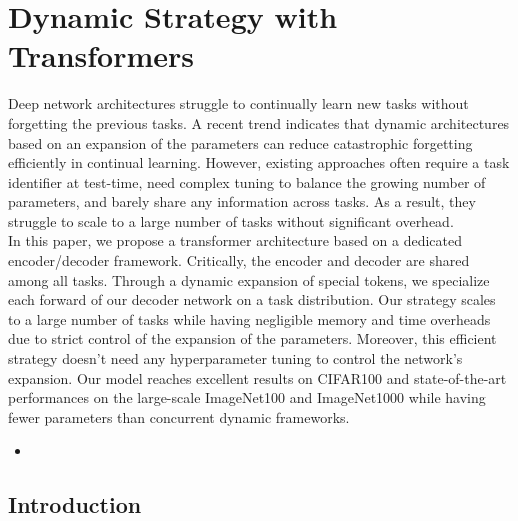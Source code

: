 \chapter{Dynamic Strategy with Transformers}
\label{chapter:dynamic}

\begin{chapabstract}
    Deep network architectures struggle to continually learn new tasks without forgetting the
    previous tasks. A recent trend indicates that dynamic architectures based on an expansion of the
    parameters can reduce catastrophic forgetting efficiently in continual learning. However,
    existing approaches often require a task identifier at test-time, need complex tuning to balance
    the growing number of parameters, and barely share any information across tasks. As a result,
    they struggle to scale to a large number of tasks without significant overhead.\\
    In this paper, we propose a transformer architecture based on a dedicated encoder/decoder
    framework. Critically, the encoder and decoder are shared among all tasks. Through a dynamic
    expansion of special tokens, we specialize each forward of our decoder network on a task
    distribution. Our strategy scales to a large number of tasks while having negligible memory and
    time overheads due to strict control of the expansion of the parameters. Moreover, this
    efficient strategy doesn't need any hyperparameter tuning to control the network's expansion.
    Our model reaches excellent results on CIFAR100 and state-of-the-art performances on the
    large-scale ImageNet100 and ImageNet1000 while having fewer parameters than concurrent dynamic
    frameworks.

    \begin{itemize}
        \item {}
    \end{itemize}

\end{chapabstract}
\newpage

\minitoc
{} 



\section{Introduction}
\label{sec:dytox_intro}


